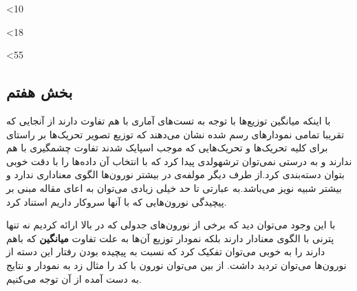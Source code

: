 \documentclass[12pt,onecolumn,a4paper,fleqn]{article}
\begin{document}
		 \begin{figure}[ht]
		 	\centering
			\hfill
		 \end{figure}
		 
		 \addtocounter{int}{1}\ifnum\value{int}<10
		 \repeat
		 
		 
		 \loop
		 
		 \begin{figure}[h]
		 	\centering
		 	\hfill
		 \end{figure}
		 
		 
		 \addtocounter{int}{1}\ifnum\value{int}<18
		 \repeat
		 
		 \clearpage
		 
		 \loop
		 
		 
		 \begin{figure}[h]
		 	\centering
		 	\hfill
		 \end{figure}	 	     

		 
		 \addtocounter{int}{1}\ifnum\value{int}<55
		 \repeat 
		 
		 \clearpage
		 
		\subsection{بخش هفتم}
	با اینکه میانگین توزیع‌ها با توجه به تست‌های آماری با هم تفاوت دارند از آنجایی که تقریبا تمامی نمودار‌های رسم شده نشان می‌دهند که توزیع تصویر تحریک‌ها بر راستای  برای کلیه تحریک‌ها و تحریک‌هایی که موجب اسپایک شدند تفاوت چشمگیری با هم ندارند و به درستی نمی‌توان ترشهولدی پیدا کرد که با انتخاب آن داده‌ها را با دقت خوبی بتوان دسته‌بندی کرد.از طرف دیگر مولفه‌ی  در بیشتر نورون‌ها الگوی‌ معناداری ندارد و بیشتر شبیه نویز‌ می‌باشد.به عبارتی تا حد خیلی زیادی می‌توان به اعای مقاله مبنی بر پیچیدگی نور‌ون‌هایی که با آنها سروکار داریم استناد کرد.
	
	با این وجود می‌توان دید که برخی از نورون‌های جدولی که در بالا ارائه کردیم نه تنها پترنی با الگوی معنادار دارند بلکه نمودار توزیع آن‌ها به علت تفاوت \textbf{میانگین} که باهم دارند را به خوبی می‌توان تفکیک کرد که نسبت به پیچیده بودن رفتار این دسته از نورون‌ها می‌توان تردید داشت. از بین می‌توان نورون با کد  را مثال زد به نمودار و نتایج به دست آمده از آن توجه می‌کنیم.
		
\end{document}
